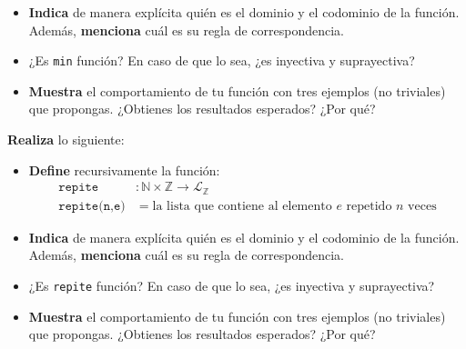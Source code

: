 \documentclass[oneside]{style}
\begin{document}
\begin{questions}[label=\protect\circled{\bfseries\arabic*}]
{\begin{itemize}
            \item \textbf{Indica} de manera explícita quién es el dominio y el 
            codominio de la función. Además, \textbf{menciona} cuál es su regla 
            de correspondencia.

            \item ¿Es \texttt{min} función? En caso de que lo sea, ¿es inyectiva 
            y suprayectiva?

            \item \textbf{Muestra} el comportamiento de tu función con tres 
            ejemplos (no triviales) que propongas. ¿Obtienes los resultados 
            esperados? ¿Por qué?
        \end{itemize}
    }

    \question
    {
        \textbf{Realiza} lo siguiente:
        \begin{itemize}
            \item \textbf{Define} recursivamente la función:
            \begin{align*}
                \texttt{repite}&: \mathbb{N} \times \mathbb{Z}
                \rightarrow \mathcal{L}_\mathbb{Z} \\ 
                \texttt{repite(n,e)} &= \text{la lista que contiene 
                al elemento } e \text{ repetido } n \text{ veces}
            \end{align*}  

            \item \textbf{Indica} de manera explícita quién es el dominio y el 
            codominio de la función. Además, \textbf{menciona} cuál es su regla 
            de correspondencia.

            \item ¿Es \texttt{repite} función? En caso de que lo sea, ¿es 
            inyectiva y suprayectiva?

            \item \textbf{Muestra} el comportamiento de tu función con tres 
            ejemplos (no triviales) que propongas. ¿Obtienes los resultados 
            esperados? ¿Por qué?
        \end{itemize}
    }

\end{questions}
\end{document}
